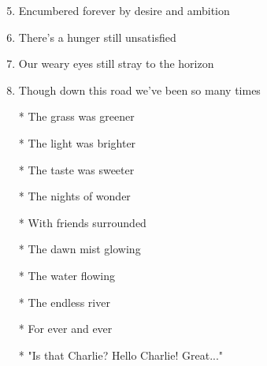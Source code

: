 \documentclass{article}
\begin{document}
\begin{center}
\begin{enumerate}
            \item[]
            \item[] \instrumental

            \item[]
            \item[] 
            \item Encumbered forever by desire and ambition
            \item There's a hunger still unsatisfied
            \item Our weary eyes still stray to the horizon
            \item Though down this road we've been so many times
            
            \item[]
            \item[] \chorus
            \item[*] The grass was greener
            \item[*] The light was brighter
            \item[*] The taste was sweeter
            \item[*] The nights of wonder
            \item[*] With friends surrounded
            \item[*] The dawn mist glowing
            \item[*] The water flowing
            \item[*] The endless river
            \item[*] For ever and ever

            \item[]
            \item[] \instrumental

            \item[]
            \item[] \outro
            \item[*] "Is that Charlie? Hello Charlie! Great..."

        \end{enumerate}
    \end{center}
\end{document}
